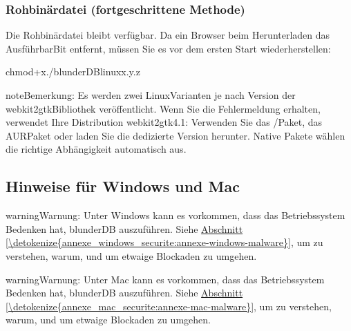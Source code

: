 \documentclass[letterpaper,10pt,german]{sphinxmanual}
\begin{document}
\subsubsection{Rohbinärdatei (fortgeschrittene Methode)}
\label{\detokenize{telecharge_install:binaire-brut-methode-avancee}}
\sphinxAtStartPar
Die Rohbinärdatei  bleibt verfügbar. Da ein Browser beim Herunterladen das Ausführbar\sphinxhyphen{}Bit entfernt, müssen Sie es vor dem ersten Start wiederherstellen:

\begin{sphinxVerbatim}[commandchars=\\\{\}]
chmod+x./blunderDB\PYGZhy{}linux\PYGZhy{}x.y.z
\end{sphinxVerbatim}

\begin{sphinxadmonition}{note}{Bemerkung:}
\sphinxAtStartPar
Es werden zwei Linux\sphinxhyphen{}Varianten je nach Version der webkit2gtk\sphinxhyphen{}Bibliothek veröffentlicht. Wenn Sie die Fehlermeldung  erhalten, verwendet Ihre Distribution webkit2gtk\sphinxhyphen{}4.1: Verwenden Sie das /\sphinxhyphen{}Paket, das AUR\sphinxhyphen{}Paket oder laden Sie die dedizierte Version  herunter. Native Pakete wählen die richtige Abhängigkeit automatisch aus.
\end{sphinxadmonition}


\subsection{Hinweise für Windows und Mac}
\label{\detokenize{telecharge_install:avertissements-windows-et-mac}}
\begin{sphinxadmonition}{warning}{Warnung:}
\sphinxAtStartPar
Unter Windows kann es vorkommen, dass das Betriebssystem Bedenken hat, blunderDB auszuführen. Siehe \hyperref[\detokenize{annexe_windows_securite:annexe-windows-malware}]{Abschnitt \ref{\detokenize{annexe_windows_securite:annexe-windows-malware}}}, um zu verstehen, warum, und um etwaige Blockaden zu umgehen.
\end{sphinxadmonition}

\begin{sphinxadmonition}{warning}{Warnung:}
\sphinxAtStartPar
Unter Mac kann es vorkommen, dass das Betriebssystem Bedenken hat, blunderDB auszuführen. Siehe \hyperref[\detokenize{annexe_mac_securite:annexe-mac-malware}]{Abschnitt \ref{\detokenize{annexe_mac_securite:annexe-mac-malware}}}, um zu verstehen, warum, und um etwaige Blockaden zu umgehen.
\end{sphinxadmonition}
\end{document}

